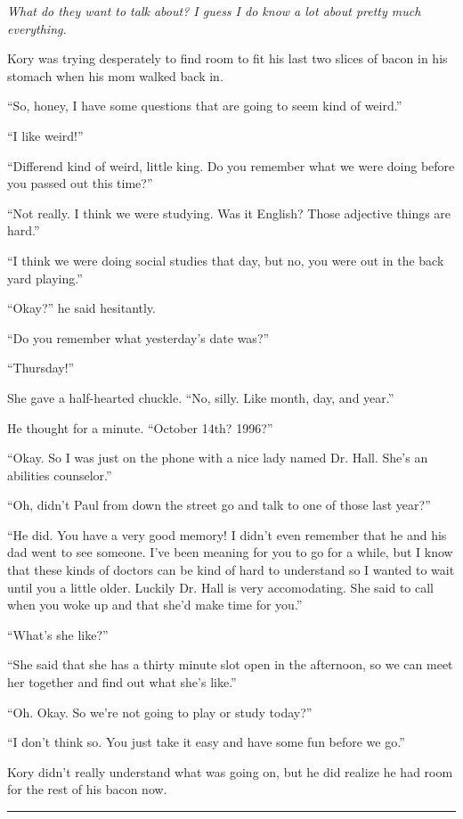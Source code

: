 \documentclass[9pt]{memoir}
\renewcommand{\line}{\noindent \rule{\textwidth}{1pt} \vspace{1em}}
\begin{document}
\textit{What do they want to talk about? I guess I do know a lot about pretty much everything.}

Kory was trying desperately to find room to fit his last two slices of bacon in his stomach when his mom walked back in.

``So, honey, I have some questions that are going to seem kind of weird.''

``I like weird!''

``Differend kind of weird, little king. Do you remember what we were doing before you passed out this time?''

``Not really. I think we were studying. Was it English? Those adjective things are hard.''

``I think we were doing social studies that day, but no, you were out in the back yard playing.''

``Okay?'' he said hesitantly.

``Do you remember what yesterday's date was?''

``Thursday!''

She gave a half-hearted chuckle. ``No, silly. Like month, day, and year.''

He thought for a minute. ``October 14th? 1996?''

``Okay. So I was just on the phone with a nice lady named Dr. Hall. She's an abilities counselor.''

``Oh, didn't Paul from down the street go and talk to one of those last year?''

``He did. You have a very good memory! I didn't even remember that he and his dad went to see someone. I've been meaning for you to go for a while, but I know that these kinds of doctors can be kind of hard to understand so I wanted to wait until you a little older. Luckily Dr. Hall is very accomodating. She said to call when you woke up and that she'd make time for you.''

``What's she like?''

``She said that she has a thirty minute slot open in the afternoon, so we can meet her together and find out what she's like.''

``Oh. Okay. So we're not going to play or study today?''

``I don't think so. You just take it easy and have some fun before we go.''

Kory didn't really understand what was going on, but he did realize he had room for the rest of his bacon now.

\line
\end{document}
